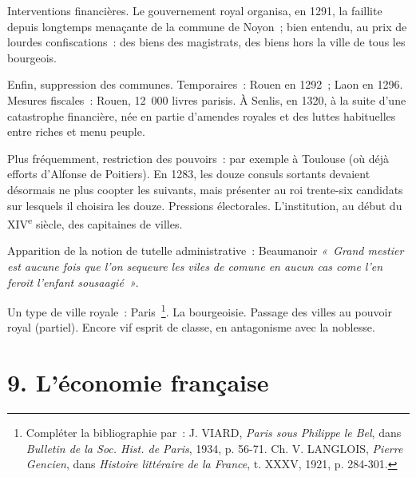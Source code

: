 \documentclass[french,twoside]{book} %
\newcommand\chapteropen{} %
\newcommand\chapterclose{} %
\begin{document}
Interventions financières. Le gouvernement royal organisa, en 1291, la faillite depuis longtemps menaçante de la commune de Noyon ; bien entendu, au prix de lourdes confiscations : des biens des magistrats, des biens hors la ville de tous les bourgeois.\par
Enfin, suppression des communes. Temporaires : Rouen en 1292 ; Laon en 1296. Mesures fiscales : Rouen, 12 000 livres parisis. À Senlis, en 1320, à la suite d’une catastrophe financière, née en partie d’amendes royales et des luttes habituelles entre riches et menu peuple.\par
Plus fréquemment, restriction des pouvoirs : par exemple à Toulouse (où déjà efforts d’Alfonse de Poitiers). En 1283, les douze consuls sortants devaient désormais ne plus coopter les suivants,  
\label{p81} mais présenter au roi trente-six candidats sur lesquels il choisira les douze. Pressions électorales. L’institution, au début du XIV\textsuperscript{e} siècle, des capitaines de villes.\par
Apparition de la notion de tutelle administrative : Beaumanoir \emph{« Grand mestier est aucune fois que l’on sequeure les viles de comune en aucun cas come l’en feroit l’enfant sousaagié »}.\par
Un type de ville royale : Paris \footnote{ Compléter la bibliographie par : J. VIARD, {\itshape Paris sous Philippe le Bel}, dans {\itshape Bulletin de la Soc. Hist. de Paris}, 1934, p. 56-71. Ch. V. LANGLOIS, {\itshape Pierre Gencien}, dans {\itshape Histoire littéraire de la France}, t. XXXV, 1921, p. 284-301.}. La bourgeoisie. Passage des villes au pouvoir royal (partiel). Encore vif esprit de classe, en antagonisme avec la noblesse.\par

\begin{center}
\noindent \centerline{}
\end{center}

\chapterclose


\chapteropen
\chapter[{9. L’économie française }]{\textsc{9. }L’économie française \protect\footnotemark }
\label{c09}\renewcommand{\leftmark}{\textsc{9. }L’économie française }
\end{document}
